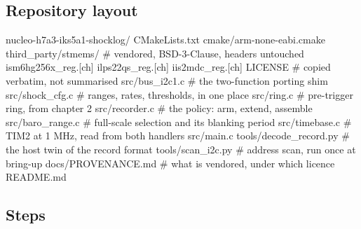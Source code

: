 \subsection*{Repository layout}

\begin{plaincode}
nucleo-h7a3-iks5a1-shocklog/
  CMakeLists.txt
  cmake/arm-none-eabi.cmake
  third_party/stmems/           # vendored, BSD-3-Clause, headers untouched
    ism6hg256x_reg.[ch]
    ilps22qs_reg.[ch]
    iis2mdc_reg.[ch]
    LICENSE                     # copied verbatim, not summarised
  src/bus_i2c1.c                # the two-function porting shim
  src/shock_cfg.c               # ranges, rates, thresholds, in one place
  src/ring.c                    # pre-trigger ring, from chapter 2
  src/recorder.c                # the policy: arm, extend, assemble
  src/baro_range.c              # full-scale selection and its blanking period
  src/timebase.c                # TIM2 at 1 MHz, read from both handlers
  src/main.c
  tools/decode_record.py        # the host twin of the record format
  tools/scan_i2c.py             # address scan, run once at bring-up
  docs/PROVENANCE.md            # what is vendored, under which licence
  README.md
\end{plaincode}

\subsection*{Steps}

